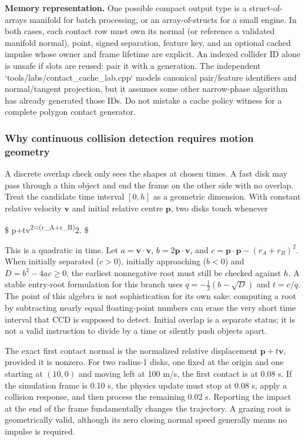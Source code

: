 \textbf{Memory representation.} One possible compact output type is a struct-of-arrays manifold for batch processing, or an array-of-structs for a small engine. In both cases, each contact row must own its normal (or reference a validated manifold normal), point, signed separation, feature key, and an optional cached impulse whose owner and frame lifetime are explicit. An indexed collider ID alone is unsafe if slots are reused: pair it with a generation. The independent `tools/labs/contact\_cache\_lab.cpp` models canonical pair/feature identifiers and normal/tangent projection, but it assumes some other narrow-phase algorithm has already generated those IDs. Do not mistake a cache policy witness for a complete polygon contact generator.

\subsubsection{Why continuous collision detection requires motion geometry}\label{04-visual-computing-ii-ch026-why-continuous-collision-detection-requires-motion-geometry}

A discrete overlap check only sees the shapes at chosen times. A fast disk may pass through a thin object and end the frame on the other side with no overlap. Treat the candidate time interval \([0,h]\) as a geometric dimension. With constant relative velocity \(\mathbf v\) and initial relative centre \(\mathbf p\), two disks touch whenever

\$ \textbar{}\mathbf p+t\mathbf v\textbar{}\textsuperscript{2=(r\_A+r\_B)}2. \$

This is a quadratic in time. Let \(a=\mathbf v\cdot\mathbf v\), \(b=2\mathbf p\cdot\mathbf v\), and \(c=\mathbf p\cdot\mathbf p-(r_A+r_B)^2\). When initially separated (\(c>0\)), initially approaching (\(b<0\)) and \(D=b^2-4ac\ge0\), the earliest nonnegative root must still be checked against \(h\). A stable entry-root formulation for this branch uses \(q=-\frac12(b-\sqrt D)\) and \(t=c/q\). The point of this algebra is not sophistication for its own sake: computing a root by subtracting nearly equal floating-point numbers can erase the very short time interval that CCD is supposed to detect. Initial overlap is a separate status; it is not a valid instruction to divide by a time or silently push objects apart.

The exact first contact normal is the normalized relative displacement \(\mathbf p+t\mathbf v\), provided it is nonzero. For two radius-1 disks, one fixed at the origin and one starting at \((10,0)\) and moving left at 100 m/s, the first contact is at 0.08 s. If the simulation frame is 0.10 s, the physics update must stop at 0.08 s, apply a collision response, and then process the remaining 0.02 s. Reporting the impact at the end of the frame fundamentally changes the trajectory. A grazing root is geometrically valid, although its zero closing normal speed generally means no impulse is required.


